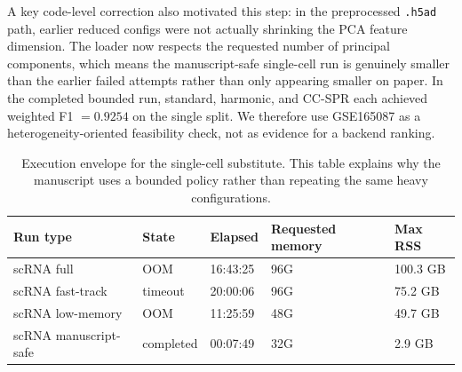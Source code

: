 \documentclass[11pt]{article}
\begin{document}
A key code-level correction also motivated this step: in the preprocessed \texttt{.h5ad} path, earlier reduced configs were not actually shrinking the PCA feature dimension. The loader now respects the requested number of principal components, which means the manuscript-safe single-cell run is genuinely smaller than the earlier failed attempts rather than only appearing smaller on paper. In the completed bounded run, standard, harmonic, and CC-SPR each achieved weighted F1 $=0.9254$ on the single split. We therefore use GSE165087 as a heterogeneity-oriented feasibility check, not as evidence for a backend ranking.

\begin{table}[h]
\centering
\small
\begin{tabular}{lllll}
\toprule
Run type & State & Elapsed & Requested memory & Max RSS \\
\midrule
scRNA full & OOM & 16:43:25 & 96G & 100.3 GB \\
scRNA fast-track & timeout & 20:00:06 & 96G & 75.2 GB \\
scRNA low-memory & OOM & 11:25:59 & 48G & 49.7 GB \\
scRNA manuscript-safe & completed & 00:07:49 & 32G & 2.9 GB \\
\bottomrule
\end{tabular}
\caption{Execution envelope for the single-cell substitute. This table explains why the manuscript uses a bounded policy rather than repeating the same heavy configurations.}
\label{tab:scRNAresource}
\end{table}
\end{document}
